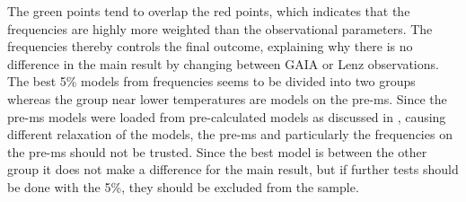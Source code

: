 The green points tend to overlap the red points, which indicates that the frequencies are highly more weighted than the observational parameters. The frequencies thereby controls the final outcome, explaining why there is no difference in the main result by changing between GAIA or Lenz observations. The best 5\% models from frequencies seems to be divided into two groups whereas the group near lower temperatures are models on the pre-ms. Since the pre-ms models were loaded from pre-calculated models as discussed in , causing different relaxation of the models, the pre-ms and particularly the frequencies on the pre-ms should not be trusted. Since the best model is between the other group it does not make a difference for the main result, but if further tests should be done with the 5\%, they should be excluded from the sample. 

